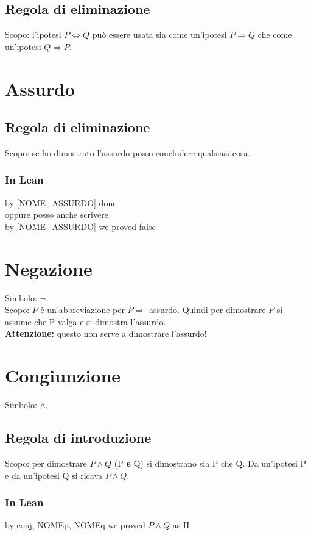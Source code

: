 \documentclass[12pt]{article}
\begin{document}
\subsection{Regola di eliminazione}
Scopo: l'ipotesi $P \Leftrightarrow Q$ può essere usata sia come un'ipotesi $P \Rightarrow Q$ che come un'ipotesi $Q \Rightarrow P$.
\section{Assurdo}
\subsection{Regola di eliminazione}
Scopo: se ho dimostrato l'assurdo posso concludere qualsiasi cosa.
\subsubsection{In Lean}
\begin{center}
    by [NOME\_ASSURDO] done \\
    oppure posso anche scrivere\\
    by [NOME\_ASSURDO] we proved false
\end{center}
\section{Negazione}
Simbolo: $\neg$.\\
Scopo: $\overline{P}$ è un'abbreviazione per $P \Rightarrow$ assurdo. Quindi per dimostrare $\overline{P}$ si assume che P valga e si dimostra l'assurdo.\\
\textbf{Attenzione:} questo non serve a dimostrare l'assurdo!
\section{Congiunzione}
Simbolo: $\wedge$.
\subsection{Regola di introduzione}
Scopo: per dimostrare $P \wedge Q$ (P \textbf{e} Q) si dimostrano sia P che Q. Da un'ipotesi P e da un'ipotesi Q si ricava $P \wedge Q$.
\subsubsection{In Lean}
\begin{center}
    by conj, NOMEp, NOMEq we proved $P \wedge Q$ as H
\end{center}
\end{document}
